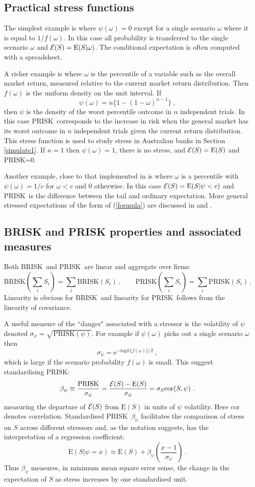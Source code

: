 \documentclass[authoryear]{elsarticle}
\newcommand{\logit}{\mathrm{logit}}
\newcommand{\E}{\mathrm{E}}
\newcommand{\e}{\mathrm{e}}
\newcommand{\Ex}{{\cal E}}
\newcommand{\Es}{\Ex}
\newcommand{\cor}{\mathrm{cor}}
\newcommand{\br}{\ensuremath{\mathrm{BRISK}}}
\newcommand{\pr}{\ensuremath{\mathrm{PRISK}}}
\newcommand{\eref}[1]{(\ref{#1})}
\newcommand{\sref}[1]{Section \ref{#1}}
\newcommand{\cq}{\ , \qquad}
\begin{document}
\subsection{Practical stress functions}
The simplest example is where $\psi(\omega)=0$ except for a single  scenario $\omega$ where it is equal to $1/f(\omega)$.   In this case all probability is transferred to the single scenario $\omega$ and $\Es(S)=\E(S|\omega)$.  The conditional expectation is often computed with a spreadsheet.

A richer example is where $\omega$ is the percentile of a variable such as the overall market return, measured relative to the current  market return distribution.   Then $f(\omega)$ is the uniform density on the unit interval.   If 
$$
\psi(\omega)=n\{1-(1-\omega)^{n-1}\}\ ,
$$
then $\psi$ is the density of the worst percentile outcome in $n$ independent trials.   In this case \pr\  corresponds to the increase in risk when the general market has its worst outcome in $n$ independent trials given the current return distribution.  This stress function  is used to study stress in Australian banks in \sref{simulate1}.  If $n=1$ then $\psi(\omega)=1$, there is no stress, and $\Es(S)=\E(S)$ and \pr=0.

Another example, close to that implemented in \cite{brownlees2015} is where $\omega$ is a percentile with $\psi(\omega)=1/c$ for $\omega<c$ and 0 otherwise.   In this case  $\Es(S)=\E(S|\psi<c)$ and \pr\  is the difference between the   tail and ordinary expectation.
More general stressed expectations of the form of \eref{formula} are discussed in \cite{furman2008weighted1} and \cite{choo2010determining}.

\subsection{BRISK and PRISK properties and associated measures}

Both \br\ and \pr\ are linear and aggregate over firms:
$$
\br\left(\sum_iS_i\right) = \sum_i\br\left(S_i\right)\cq\pr\left(\sum_iS_i\right) = \sum_i\pr\left(S_i\right)\ .
$$
Linearity is obvious for \br\ and linearity for \pr\  follows from the linearity of covariance.  

A useful measure of the ``danger" associated with a stressor is the volatility of $\psi$ denoted $\sigma_\psi=\sqrt{\pr(\psi)}$.  For example if $\psi(\omega)$ picks out a single scenario $\omega$ then 
$$
\sigma_\psi= \e^{-\logit\{f(\omega)\}/2}\ ,
$$
which is large if the scenario probability $f(\omega)$ is small.  This suggest standardising \pr:
$$
\beta_\psi\equiv\frac{\pr}{\sigma_\psi} = \frac{\Es(S)-\E(S)}{\sigma_\psi}=\sigma_S\cor(S,\psi)\ .
$$
measuring the departure of $\Es(S)$ from $\E(S)$ in units of $\psi$ volatility. Here $\cor$ denotes correlation. Standardised \pr\ $\beta_\psi$ facilitates the comparison of stress on $S$ across different stressors and, as the notation suggests, has the interpretation of a regression coefficient:
$$
\E(S|\psi=x) \approx \E(S)+\beta_\psi \left(\frac{x-1}{\sigma_\psi}\right)\ .
$$
Thus $\beta_\psi$ measures, in minimum mean square error sense, the change in the expectation of $S$ as stress increases by one standardised unit.
\end{document}
